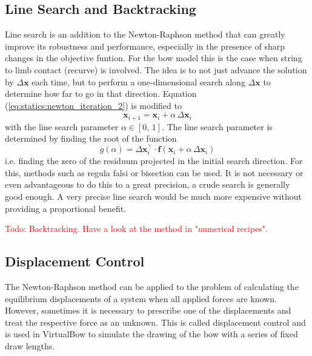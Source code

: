 \subsection{Line Search and Backtracking}

Line search is an addition to the Newton-Raphson method that can greatly improve its robustness and performance, especially in the presence of sharp changes in the objective funtion.
For the bow model this is the case when string to limb contact (recurve) is involved.
The idea is to not just advance the solution by $\Delta\boldsymbol{x}$ each time, but to perform a one-dimensional search along $\Delta\boldsymbol{x}$ to determine how far to go in that direction.
Equation (\ref{eq:statics:newton_iteration_2}) is modified to
%
\begin{equation}
\boldsymbol{x}_{i+1} = \boldsymbol{x}_i + \alpha\,\Delta\boldsymbol{x}_i
\end{equation}
%
with the line search parameter $\alpha \in [0,\,1]$. The line search parameter is determined by finding the root of the function
%
\begin{equation}
g(\alpha) = \Delta\boldsymbol{x}_i^\intercal \cdot \boldsymbol{f}(\boldsymbol{x}_i + \alpha\,\Delta\boldsymbol{x}_i)
\end{equation}
%
i.e. finding the zero of the residuum projected in the initial search direction.
For this, methods such as regula falsi or bisection can be used.
It is not necessary or even advantageous to do this to a great precision, a crude search is generally good enough.
A very precise line search would be much more expensive without providing a proportional benefit.

\textcolor{red}{Todo: Backtracking. Have a look at the method in "numerical recipes".}

\subsection{Displacement Control}

The Newton-Raphson method can be applied to the problem of calculating the equilibrium displacements of a system when all applied forces are known.
However, sometimes it is necessary to prescribe one of the displacements and treat the respective force as an unknown.
This is called displacement control and is used in VirtualBow to simulate the drawing of the bow with a series of fixed draw lengths.

